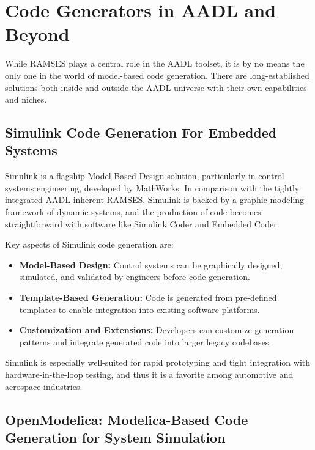\section{Code Generators in AADL and Beyond} \label{sub:code_generators}

While RAMSES plays a central role in the AADL toolset, it is by no means the only one in the world of model-based code generation. There are long-established solutions both inside and outside the AADL universe with their own capabilities and niches.




\subsection*{Simulink Code Generation For Embedded Systems}

Simulink is a flagship Model-Based Design solution, particularly in control systems engineering, developed by MathWorks. In comparison with the tightly integrated AADL-inherent RAMSES, Simulink is backed by a graphic modeling framework of dynamic systems, and the production of code becomes straightforward with software like Simulink Coder and Embedded Coder.

Key aspects of Simulink code generation are:
 \begin{itemize} 
 	\item \textbf{Model-Based Design:} Control systems can be graphically designed, simulated, and validated by engineers before code generation. 
 	\item \textbf{Template-Based Generation:} Code is generated from pre-defined templates to enable integration into existing software platforms. 
 	\item \textbf{Customization and Extensions:} Developers can customize generation patterns and integrate generated code into larger legacy codebases. 
 \end{itemize}

Simulink is especially well-suited for rapid prototyping and tight integration with hardware-in-the-loop testing, and thus it is a favorite among automotive and aerospace industries.

\subsection*{OpenModelica: Modelica-Based Code Generation for System Simulation}

